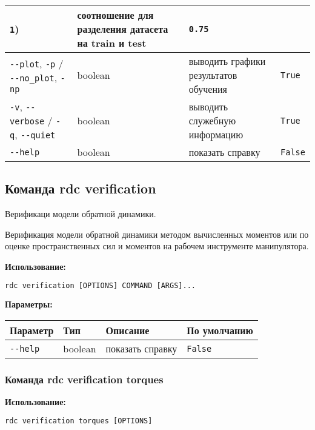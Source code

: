 \begin{center}
\begin{longtable}[]{p{5cm}|p{2cm}|p{3.5cm}|p{5cm}}
\texttt{1}) & соотношение для разделения датасета на train и test & \texttt{0.75} \\
\hline
\texttt{-\/-plot}, \texttt{-p} / \texttt{-\/-no\_plot}, \texttt{-np} &
boolean & выводить графики результатов обучения & \texttt{True} \\
\hline
\texttt{-v}, \texttt{-\/-verbose} / \texttt{-q}, \texttt{-\/-quiet} &
boolean & выводить служебную информацию & \texttt{True} \\
\hline
\texttt{-\/-help} & boolean & показать справку &
\texttt{False} \\
\bottomrule()
\hline
\end{longtable}
\end{center}

\hypertarget{rdc-verification}{%
\subsection{Команда rdc verification}\label{rdc-verification}}

Верификаци модели обратной динамики.

Верификация модели обратной динамики методом вычисленных моментов или по оценке пространственных сил и моментов на рабочем инструменте манипулятора.

\textbf{Использование:}
\begin{lstlisting}[language=python, numbers=none, frame=single]
rdc verification [OPTIONS] COMMAND [ARGS]...
\end{lstlisting}

\textbf{Параметры:}
\begin{center}
\fontsize{10pt}{10pt}\selectfont
\begin{longtable}[]{p{5cm}|p{2cm}|p{3.5cm}|p{5cm}}
    \hline
\toprule()
Параметр & Тип & Описание & По умолчанию \\
\hline
\midrule()
\endhead
\texttt{-\/-help} & boolean & показать справку &
\texttt{False} \\
\bottomrule()
\hline
\end{longtable}
\end{center}

\hypertarget{rdc-verification-torques}{%
\subsubsection{ Команда rdc verification torques}\label{rdc-verification-torques}}

\textbf{Использование:}
\begin{lstlisting}[language=python, numbers=none, frame=single]
rdc verification torques [OPTIONS]
\end{lstlisting}

